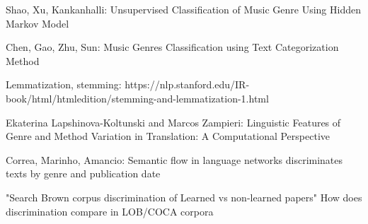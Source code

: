 \documentclass{article}
\begin{document}
Shao, Xu, Kankanhalli: Unsupervised Classification of Music Genre Using Hidden Markov Model

Chen, Gao, Zhu, Sun: Music Genres Classification using Text Categorization Method

Lemmatization, stemming: https://nlp.stanford.edu/IR-book/html/htmledition/stemming-and-lemmatization-1.html

Ekaterina Lapshinova-Koltunski and Marcos Zampieri: Linguistic Features of Genre and Method Variation in Translation: A Computational Perspective

Correa, Marinho, Amancio: Semantic flow in language networks discriminates texts by genre and publication date

"Search Brown corpus discrimination of Learned vs non-learned papers"
How does discrimination compare in LOB/COCA corpora
\end{document}

